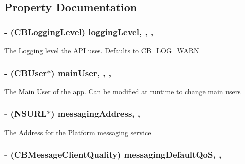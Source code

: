 \subsection{Property Documentation}
\hypertarget{interface_clear_blade_a63988be37c99a5e90c91b89be9106a5d}{
\subsubsection[{logging\+Level}]{\setlength{\rightskip}{0pt plus 5cm}-\/ (C\+B\+Logging\+Level) logging\+Level\hspace{0.3cm}{\ttfamily [read]}, {\ttfamily [write]}, {\ttfamily [atomic]}, {\ttfamily [assign]}}}\label{interface_clear_blade_a63988be37c99a5e90c91b89be9106a5d}
The Logging level the A\+P\+I uses. Defaults to C\+B\+\_\+\+L\+O\+G\+\_\+\+W\+A\+R\+N \hypertarget{interface_clear_blade_a2c5ec6113244b327a374c1f939efbce5}{
\subsubsection[{main\+User}]{\setlength{\rightskip}{0pt plus 5cm}-\/ ({\bf C\+B\+User}$\ast$) main\+User\hspace{0.3cm}{\ttfamily [read]}, {\ttfamily [write]}, {\ttfamily [atomic]}, {\ttfamily [strong]}}}\label{interface_clear_blade_a2c5ec6113244b327a374c1f939efbce5}
The Main User of the app. Can be modified at runtime to change main users \hypertarget{interface_clear_blade_a6d90355650360ef27ac6aad5f3df2a7b}{
\subsubsection[{messaging\+Address}]{\setlength{\rightskip}{0pt plus 5cm}-\/ (N\+S\+U\+R\+L$\ast$) messaging\+Address\hspace{0.3cm}{\ttfamily [read]}, {\ttfamily [atomic]}, {\ttfamily [assign]}}}\label{interface_clear_blade_a6d90355650360ef27ac6aad5f3df2a7b}
The Address for the Platform messaging service \hypertarget{interface_clear_blade_a886dc9ea49818af85910b4373f95096b}{
\subsubsection[{messaging\+Default\+Qo\+S}]{\setlength{\rightskip}{0pt plus 5cm}-\/ (C\+B\+Message\+Client\+Quality) messaging\+Default\+Qo\+S\hspace{0.3cm}{\ttfamily [read]}, {\ttfamily [atomic]}, {\ttfamily [assign]}}}\label{interface_clear_blade_a886dc9ea49818af85910b4373f95096b}
